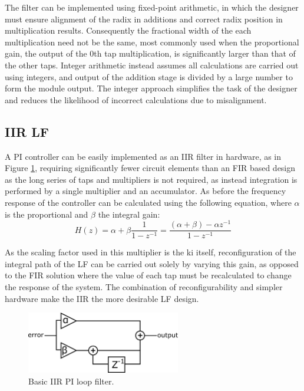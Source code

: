 The filter can be implemented using fixed-point arithmetic, in which the designer must ensure alignment of the radix in additions and correct radix position in multiplication results. Consequently the fractional width of the each multiplication need not be the same, most commonly used when the proportional gain, the output of the 0th tap multiplication, is significantly larger than that of the other taps. Integer arithmetic instead assumes all calculations are carried out using integers, and output of the addition stage is divided by a large number to form the module output. The integer approach simplifies the task of the designer and reduces the likelihood of incorrect calculations due to misalignment.

\subsection{\acs{IIR} \acl{LF}}
A \ac{PI} controller can be easily implemented as an \acl{IIR} filter in hardware, as in Figure \ref{fig:iir_pi}, requiring significantly fewer circuit elements than an \ac{FIR} based design as the long series of taps and multipliers is not required, as instead integration is performed by a single multiplier and an accumulator. As before the frequency response of the controller can be calculated using the following equation, where $\alpha$ is the proportional and $\beta$ the integral gain:
\begin{equation*}
	H(z) = \alpha + \beta\frac{1}{1-z^{-1}} = \frac{(\alpha + \beta) - \alpha z^{-1}}{1-z^{-1}}
\end{equation*}

As the scaling factor used in this multiplier is the \ac{ki} itself, reconfiguration of the integral path of the \acl{LF} can be carried out solely by varying this gain, as opposed to the \ac{FIR} solution where the value of each tap must be recalculated to change the response of the system. The combination of reconfigurability and simpler hardware make the \ac{IIR} the more desirable \ac{LF} design.
\begin{figure}[h]
	\centering
	\includegraphics[width=0.6\textwidth]{../simple_pi.pdf}
	\caption[Basic \ac{IIR} \ac{PI} loop filter]{Basic \ac{IIR} \ac{PI} loop filter.}
	\label{fig:iir_pi}
\end{figure}

